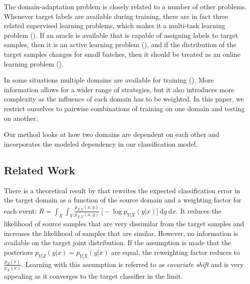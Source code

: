 \documentclass[twoside,11pt]{article}
\begin{document}
The domain-adaptation problem is closely related to a number of other problems. Whenever target labels are available during training, there are in fact three related supervised learning problems, which makes it a multi-task learning problem (\citealp{pan2010survey, moreno2012unifying}). If an oracle is available that is capable of assigning labels to target samples, then it is an active learning problem (\citealp{cohn1996active}), and if the distribution of the target samples changes for small batches, then it should be treated as an online learning problem (\citealp{ma2009identifying}). 

In some situations multiple domains are available for training (\citealp{mansour2009domaina}). More information allows for a wider range of strategies, but it also introduces more complexity as the influence of each domain has to be weighted. In this paper, we restrict ourselves to pairwise combinations of training on one domain and testing on another.

Our method looks at how two domains are dependent on each other and incorporates the modeled dependency in our classification model.

\subsection{Related Work}


There is a theoretical result by \cite{shimodaira2000improving} that rewrites the expected classification error in the target domain as a function of the source domain and a weighting factor for each event: $R= \int_{X} \int_{Y} \frac{p_{Z,Y}(x,y)}{p_{X,Y}(x,y)} \ \big[-\log p_{Y|X}(y|x)\big] \ \mathrm{d}y \ \mathrm{d}x$. It reduces the likelihood of source samples that are very dissimilar from the target samples and increases the likelihood of samples that are similar. However, no information is available on the target joint distribution. If the assumption is made that the posteriors $p_{Y|Z}(y|x)=p_{Y|X}(y|x)$ are equal, the reweighting factor reduces to $\frac{p_{Z}(x)}{p_{X}(x)}$. Learning with this assumption is referred to as \emph{covariate shift} and is very appealing as it converges to the target classifier in the limit. 
\end{document}
